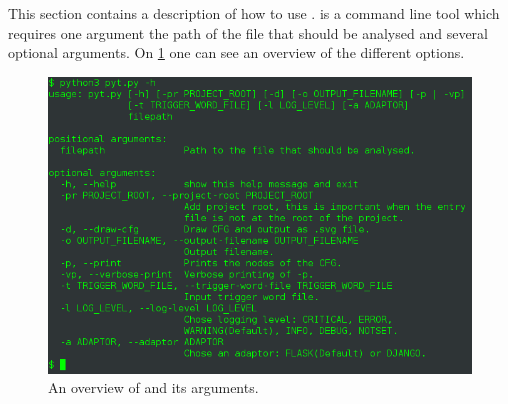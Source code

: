 \section{\pyt}
This section contains a description of how to use \pyt{}.
\pyt{} is a command line tool which requires one argument the path of the file that should be analysed and several optional arguments.
On \cref{tool_overview} one can see an overview of the different options.

\begin{figure}
  \includegraphics[width=\textwidth]{./figures/pyt_overview.png}
  \caption{An overview of \pyt{} and its arguments.}
  \label{tool_overview}
\end{figure}
